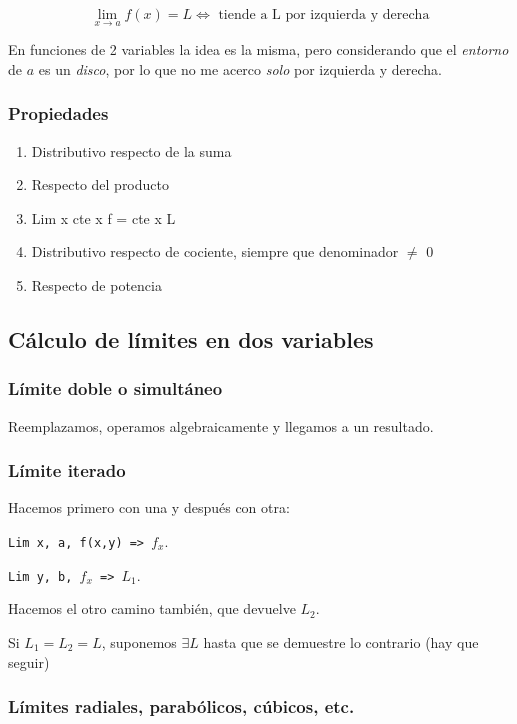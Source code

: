 \begin{equation*}
    \lim_{x\to a} f(x) = L \iff \text{ tiende a L por izquierda y derecha}
\end{equation*}

En funciones de 2 variables la idea es la misma, pero considerando que el 
\textit{entorno} de \(a\) es un \textit{disco}, por lo que no me acerco 
\textit{solo} por izquierda y derecha.

\subsubsection{Propiedades}

\begin{enumerate}
    \item Distributivo respecto de la suma
    \item Respecto del producto
    \item Lim x cte x f = cte x L
    \item Distributivo respecto de cociente, siempre que denominador \(\neq\) 0
    \item Respecto de potencia
\end{enumerate}

\subsection{Cálculo de límites en dos variables}

\subsubsection{Límite doble o simultáneo}

Reemplazamos, operamos algebraicamente y llegamos a un resultado.

\subsubsection{Límite iterado}

Hacemos primero con una y después con otra:

\texttt{Lim x, a, f(x,y) => \(f_x\)}.

\texttt{Lim y, b, \(f_x\) => \(L_1\)}.

Hacemos el otro camino también,
que devuelve \(L_2\).

Si \(L_1 = L_2 = L\), suponemos \(\exists L\) hasta que se demuestre lo contrario (hay que seguir)

\subsubsection{Límites radiales, parabólicos, cúbicos, etc.}

